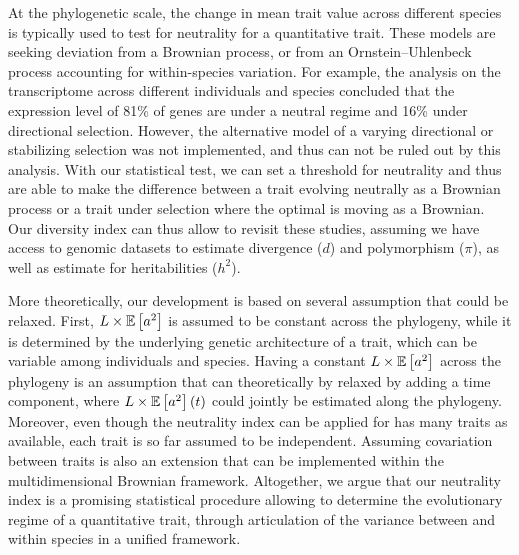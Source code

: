 \documentclass{article}
\begin{document}
At the phylogenetic scale, the change in mean trait value across different species is typically used to test for neutrality for a quantitative trait.
These models are seeking deviation from a Brownian process\cite{catalan_drift_2019}, or from an Ornstein–Uhlenbeck process accounting for within-species variation\cite{rohlfs_phylogenetic_2015}.
For example, the analysis on the transcriptome across different individuals and species concluded that the expression level of 81\% of genes are under a neutral regime and 16\% under directional selection\cite{catalan_drift_2019}.
However, the alternative model of a varying directional or stabilizing selection was not implemented, and thus can not be ruled out by this analysis.
With our statistical test, we can set a threshold for neutrality and thus are able to make the difference between a trait evolving neutrally as a Brownian process or a trait under selection where the optimal is moving as a Brownian.
Our diversity index can thus allow to revisit these studies, assuming we have access to genomic datasets to estimate divergence ($d$) and polymorphism ($\pi$), as well as estimate for heritabilities ($h^2$).


More theoretically, our development is based on several assumption that could be relaxed.
First, $L \times \operatorname{\mathbb{E}} \left[ a^2 \right]$ is assumed to be constant across the phylogeny, while it is determined by the underlying genetic architecture of a trait, which can be variable among individuals and species.
Having a constant $L \times \operatorname{\mathbb{E}} \left[ a^2 \right]$ across the phylogeny is an assumption that can theoretically by relaxed by adding a time component\cite{arnold_understanding_2008, hohenlohe_mipod_2008}, where $L \times \operatorname{\mathbb{E}} \left[ a^2 \right](t)$ could jointly be estimated along the phylogeny\cite{kostikova_bridging_2016, gaboriau_multiplatform_2020}.
Moreover, even though the neutrality index can be applied for has many traits as available, each trait is so far assumed to be independent.
Assuming covariation between traits is also an extension that can be implemented within the multidimensional Brownian framework\cite{huelsenbeck_detecting_2003, lartillot_phylogenetic_2011, lartillot_joint_2012}.
Altogether, we argue that our neutrality index is a promising statistical procedure allowing to determine the evolutionary regime of a quantitative trait, through articulation of the variance between and within species in a unified framework.
\end{document}
